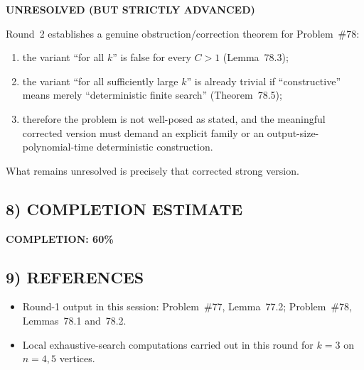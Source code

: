 \textbf{UNRESOLVED (BUT STRICTLY ADVANCED)}

Round~2 establishes a genuine obstruction/correction theorem for Problem~\#78:
\begin{enumerate}
\item the variant ``for all $k$'' is false for every $C>1$ (Lemma~78.3);
\item the variant ``for all sufficiently large $k$'' is already trivial if ``constructive'' means merely ``deterministic finite search'' (Theorem~78.5);
\item therefore the problem is not well-posed as stated, and the meaningful corrected version must demand an explicit family or an output-size-polynomial-time deterministic construction.
\end{enumerate}

What remains unresolved is precisely that corrected strong version.

\subsection*{8) COMPLETION ESTIMATE}

\textbf{COMPLETION: 60\%}

\subsection*{9) REFERENCES}

\begin{itemize}
\item Round-1 output in this session: Problem~\#77, Lemma~77.2; Problem~\#78, Lemmas~78.1 and~78.2.
\item Local exhaustive-search computations carried out in this round for $k=3$ on $n=4,5$ vertices.
\end{itemize}
